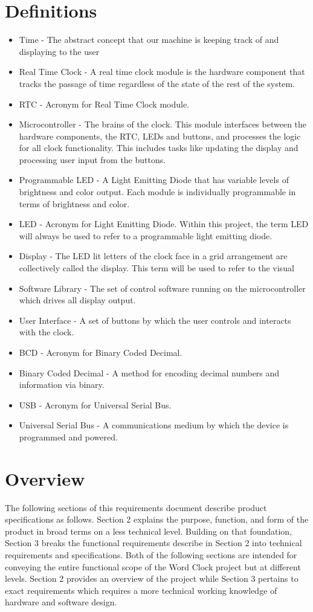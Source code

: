 \documentclass[10pt,draftclsnofoot,onecolumn]{IEEEtran}
\begin{document}
\section{Definitions}
\begin{itemize}
  \item Time - The abstract concept that our machine is keeping track of and displaying to the user
  \item Real Time Clock - A real time clock module is the hardware component that tracks the passage
  of time regardless of the state of the rest of the system.
  \item RTC - Acronym for Real Time Clock module.
  \item Microcontroller - The brains of the clock. This module interfaces between the hardware
  components, the RTC, LEDs and buttons, and processes the logic for all clock functionality.
  This includes tasks like updating the display and processing user input from the buttons.
  \item Programmable LED - A Light Emitting Diode that has variable levels of brightness and
  color output. Each module is individually programmable in terms of brightness and color.
  \item LED - Acronym for Light Emitting Diode. Within this project, the term LED will always
  be used to refer to a programmable light emitting diode.
  \item Display - The LED lit letters of the clock face in a grid arrangement are collectively
  called the display. This term will be used to refer to the visual
  \item Software Library - The set of control software running on the microcontroller which drives all display output.
  \item User Interface - A set of buttons by which the user controls and interacts with the clock.
  \item BCD - Acronym for Binary Coded Decimal.
  \item Binary Coded Decimal - A method for encoding decimal numbers and information via binary.
  \item USB - Acronym for Universal Serial Bus.
  \item Universal Serial Bus - A communications medium by which the device is programmed and  powered.
\end{itemize}

\section{Overview}
The following sections of this requirements document describe product specifications as follows.
Section 2 explains the purpose, function, and form of the product in broad terms on a less
technical level. Building on that foundation, Section 3 breaks the functional requirements
describe in Section 2 into technical requirements and specifications.
	Both of the following sections are intended for conveying the entire functional
scope of the Word Clock project but at different levels. Section 2 provides an overview of the
project while Section 3 pertains to exact requirements which requires a more technical working
knowledge of hardware and software design.
\end{document}
